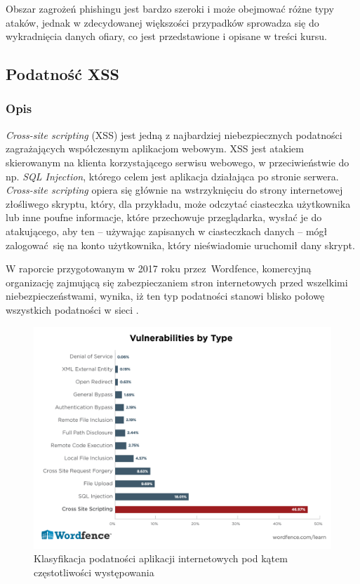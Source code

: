 \documentclass[12pt,twoside]{article}
\begin{document}
Obszar zagrożeń phishingu jest bardzo szeroki i może obejmować różne typy ataków, jednak w zdecydowanej większości przypadków sprowadza się do wykradnięcia danych ofiary, co jest przedstawione i opisane w treści kursu.

\clearpage

\subsection{Podatność XSS}
\subsubsection{Opis}

\emph{Cross-site scripting} (XSS) jest jedną z najbardziej niebezpiecznych podatności zagrażających współczesnym aplikacjom webowym. XSS jest atakiem skierowanym na klienta korzystającego serwisu webowego, w przeciwieństwie do np. \emph{SQL Injection}, którego celem jest aplikacja działająca po stronie serwera. \emph{Cross-site scripting} opiera się głównie na wstrzyknięciu do strony internetowej złośliwego skryptu, który, dla przykładu, może odczytać ciasteczka użytkownika lub inne poufne informacje, które przechowuje przeglądarka, wysłać je do atakującego, aby ten -- używając zapisanych w ciasteczkach danych -- mógł zalogować się na konto użytkownika, który nieświadomie uruchomił dany skrypt. %

W raporcie przygotowanym w 2017 roku przez Wordfence, komercyjną organizację zajmującą się zabezpieczaniem stron internetowych przed wszelkimi niebezpieczeństwami, wynika, iż ten typ podatności stanowi blisko połowę wszystkich podatności w sieci \cite{XSSReport}.

\begin{figure}[H]
	\centering
	\includegraphics[width=0.9\linewidth]{figures/xss-popularity}
	\caption{Klasyfikacja podatności aplikacji internetowych pod kątem częstotliwości występowania}
	\label{fig:xss-popularity}
\end{figure}
\end{document}
